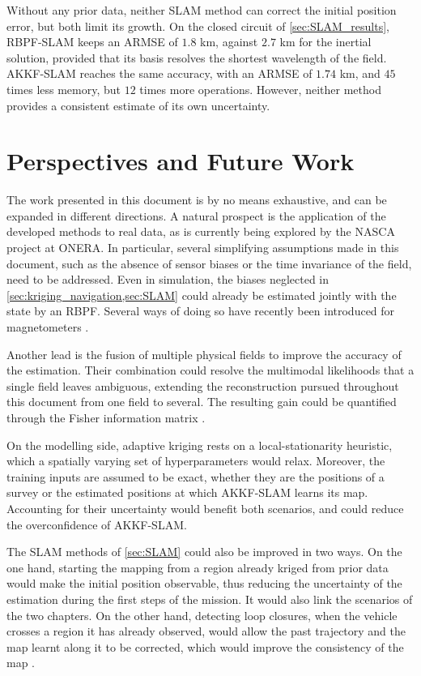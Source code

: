 Without any prior data, neither SLAM method can correct the initial position error, but both limit its growth. On the closed circuit of \cref{sec:SLAM_results}, RBPF-SLAM keeps an ARMSE of $1.8$ km, against $2.7$ km for the inertial solution, provided that its basis resolves the shortest wavelength of the field. AKKF-SLAM reaches the same accuracy, with an ARMSE of $1.74$ km, and $45$ times less memory, but $12$ times more operations. However, neither method provides a consistent estimate of its own uncertainty.

\section{Perspectives and Future Work}

The work presented in this document is by no means exhaustive, and can be expanded in different directions. A natural prospect is the application of the developed methods to real data, as is currently being explored by the NASCA project at ONERA. In particular, several simplifying assumptions made in this document, such as the absence of sensor biases or the time invariance of the field, need to be addressed. Even in simulation, the biases neglected in \cref{sec:kriging_navigation,sec:SLAM} could already be estimated jointly with the state by an RBPF. Several ways of doing so have recently been introduced for magnetometers \cite{bib:magnetometer-SLAC,bib:magnetometer-calibration-SLAM,bib:magnetometer-array-SLAM}.

Another lead is the fusion of multiple physical fields to improve the accuracy of the estimation. Their combination could resolve the multimodal likelihoods that a single field leaves ambiguous, extending the reconstruction pursued throughout this document from one field to several. The resulting gain could be quantified through the Fisher information matrix \cite{bib:bathymetry-gravimetry}.

On the modelling side, adaptive kriging rests on a local-stationarity heuristic, which a spatially varying set of hyperparameters would relax. Moreover, the training inputs are assumed to be exact, whether they are the positions of a survey or the estimated positions at which AKKF-SLAM learns its map. Accounting for their uncertainty would benefit both scenarios, and could reduce the overconfidence of AKKF-SLAM.

The SLAM methods of \cref{sec:SLAM} could also be improved in two ways. On the one hand, starting the mapping from a region already kriged from prior data would make the initial position observable, thus reducing the uncertainty of the estimation during the first steps of the mission. It would also link the scenarios of the two chapters. On the other hand, detecting loop closures, when the vehicle crosses a region it has already observed, would allow the past trajectory and the map learnt along it to be corrected, which would improve the consistency of the map \cite{bib:SLAM-survey}.

